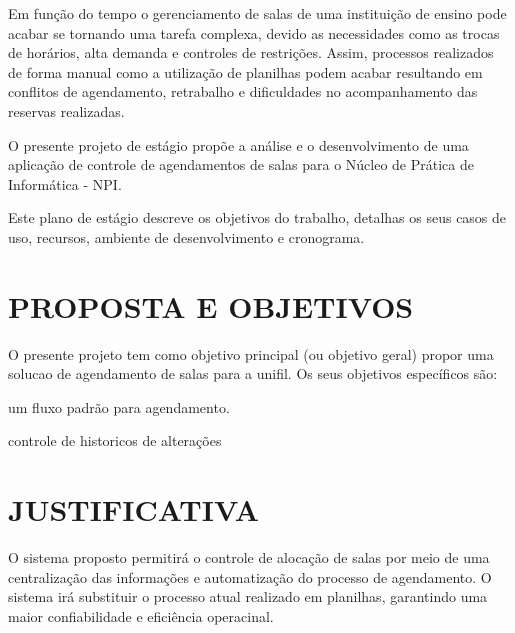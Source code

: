 Em função do tempo o gerenciamento de salas de uma instituição de ensino pode acabar se tornando uma tarefa complexa, devido as necessidades como as trocas de horários, alta demanda e controles de restrições. Assim, processos realizados de forma manual como a utilização de planilhas podem acabar resultando em conflitos de agendamento, retrabalho e dificuldades no acompanhamento das reservas realizadas.

O presente projeto de estágio propõe a análise e o desenvolvimento de uma aplicação de controle de agendamentos de salas para o Núcleo de Prática de Informática - NPI.

Este plano de estágio descreve os objetivos do trabalho, detalhas os seus casos de uso, recursos, ambiente de desenvolvimento e cronograma.

\section{PROPOSTA E OBJETIVOS}


O presente projeto tem como objetivo principal (ou objetivo geral) propor uma solucao de agendamento de salas para a unifil. Os seus objetivos específicos são:

um fluxo padrão para agendamento.

controle de historicos de alterações

\section{JUSTIFICATIVA}

O sistema proposto permitirá o controle de alocação de salas por meio de uma centralização das informações e automatização do processo de agendamento. O sistema irá substituir o processo atual realizado em planilhas, garantindo uma maior confiabilidade e eficiência operacinal.